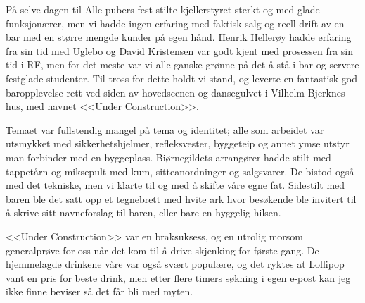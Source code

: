 På selve dagen til Alle pubers fest stilte kjellerstyret sterkt og med glade funksjonærer, men vi hadde ingen erfaring med faktisk salg og reell drift av en bar med en større mengde kunder på egen hånd. Henrik Hellerøy hadde erfaring fra sin tid med Uglebo og David Kristensen var godt kjent med prosessen fra sin tid i RF, men for det meste var vi alle ganske grønne på det å stå i bar og servere festglade studenter. Til tross for dette holdt vi stand, og leverte en fantastisk god baropplevelse rett ved siden av hovedscenen og dansegulvet i Vilhelm Bjerknes hus, med navnet <<Under Construction>>. 

Temaet var fullstendig mangel på tema og identitet; alle som arbeidet var utsmykket med sikkerhetshjelmer, refleksvester, byggeteip og annet ymse utstyr man forbinder med en byggeplass. Biørnegildets arrangører hadde stilt med tappetårn og miksepult med kum, sitteanordninger og salgsvarer. De bistod også med det tekniske, men vi klarte til og med å skifte våre egne fat. Sidestilt med baren ble det satt opp et tegnebrett med hvite ark hvor besøkende ble invitert til å skrive sitt navneforslag til baren, eller bare en hyggelig hilsen.

<<Under Construction>> var en braksuksess, og en utrolig morsom generalprøve for oss når det kom til å drive skjenking for første gang. De hjemmelagde drinkene våre var også svært populære, og det ryktes at Lollipop vant en pris for beste drink, men etter flere timers søkning i egen e-post kan jeg ikke finne beviser så det får bli med myten.
